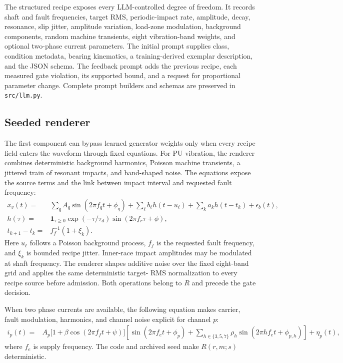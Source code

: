 \documentclass[a4paper,fleqn]{cas-sc}
\begin{document}
The structured recipe exposes every LLM-controlled degree of freedom. It
records shaft and fault frequencies, target RMS, periodic-impact rate,
amplitude, decay, resonance, slip jitter, amplitude variation, load-zone
modulation, background components, random machine transients, eight
vibration-band weights, and optional two-phase current parameters. The initial
prompt supplies class, condition metadata, bearing kinematics, a
training-derived exemplar description, and the JSON schema. The feedback
prompt adds the previous recipe, each measured gate violation, its supported
bound, and a request for proportional parameter change. Complete prompt
builders and schemas are preserved in \texttt{src/llm.py}.

\subsection{Seeded renderer}

The first component can bypass learned generator weights only when every recipe
field enters the waveform through fixed equations. For PU vibration, the
renderer combines deterministic background
harmonics, Poisson machine transients, a jittered train of resonant impacts,
and band-shaped noise. The equations expose the source terms and the link
between impact interval and requested fault frequency:
\begin{align}
x_v(t)={}&\sum_q A_q\sin(2\pi f_qt+\phi_q)
 +\sum_{\ell} b_{\ell}h(t-u_{\ell})
 +\sum_k a_kh(t-t_k)+\epsilon_b(t),\label{eq:vibration}\\
h(\tau)={}&\mathbf{1}_{\tau\geq0}\exp(-\tau/\tau_d)
             \sin(2\pi f_r\tau+\phi),\label{eq:impact}\\
t_{k+1}-t_k={}&f_f^{-1}(1+\xi_k).
\end{align}
Here $u_\ell$ follows a Poisson background process, $f_f$ is the requested
fault frequency, and $\xi_k$ is bounded recipe jitter. Inner-race impact
amplitudes may be modulated at shaft frequency. The renderer shapes additive
noise over the fixed eight-band grid and applies the same deterministic target-
RMS normalization to every recipe source before admission. Both operations
belong to $R$ and precede the gate decision.

When two phase currents are available, the following equation makes carrier,
fault modulation, harmonics, and channel noise explicit for channel $p$:
\begin{align}
i_p(t)={}&A_p\bigl[1+\beta\cos(2\pi f_ft+\psi)\bigr]
\left[\sin(2\pi f_et+\phi_p)
+\sum_{h\in\{3,5,7\}}\rho_h\sin(2\pi hf_et+\phi_{p,h})\right]
+\eta_p(t),
\label{eq:current}
\end{align}
where $f_e$ is supply frequency. The code and archived seed make $R(r,m;s)$
deterministic.
\end{document}
